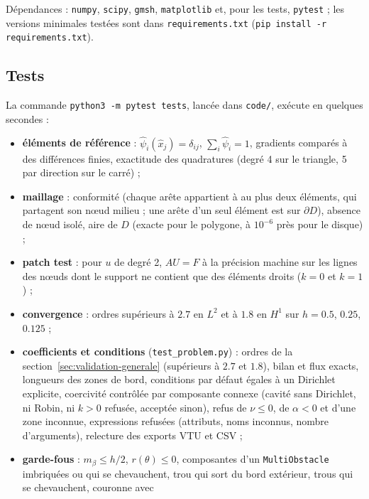\documentclass[11pt,a4paper]{article}
\begin{document}
Dépendances : \texttt{numpy}, \texttt{scipy}, \texttt{gmsh}, \texttt{matplotlib}
et, pour les tests, \texttt{pytest} ; les versions minimales testées sont
dans \texttt{requirements.txt} (\texttt{pip install -r requirements.txt}).

\subsection{Tests}
\label{sec:tests}

La commande \texttt{python3 -m pytest tests}, lancée dans \texttt{code/},
exécute en quelques secondes :
\begin{itemize}
  \item \textbf{éléments de référence} : $\widehat{\psi}_i(\hat{x}_j) = \delta_{ij}$,
        $\sum_i \widehat{\psi}_i = 1$, gradients comparés à des différences
        finies, exactitude des quadratures (degré 4 sur le triangle, 5 par
        direction sur le carré) ;
  \item \textbf{maillage} : conformité (chaque arête appartient à au plus
        deux éléments, qui partagent son nœud milieu ; une arête d'un seul
        élément est sur $\partial D$), absence de nœud isolé, aire de $D$
        (exacte pour le polygone, à $10^{-6}$ près pour le disque) ;
  \item \textbf{patch test} : pour $u$ de degré 2, $A U = F$ à la précision
        machine sur les lignes des nœuds dont le support ne contient que des
        éléments droits ($k = 0$ et $k = 1$) ;
  \item \textbf{convergence} : ordres supérieurs à $2.7$ en $L^2$ et à $1.8$
        en $H^1$ sur $h = 0.5$, $0.25$, $0.125$ ;
  \item \textbf{coefficients et conditions} (\texttt{test\_problem.py}) :
        ordres de la section~\ref{sec:validation-generale} (supérieurs à
        $2.7$ et $1.8$), bilan et flux exacts, longueurs des zones de bord,
        conditions par défaut égales à un Dirichlet explicite, coercivité
        contrôlée par composante connexe (cavité sans Dirichlet, ni Robin,
        ni $k > 0$ refusée, acceptée sinon), refus de $\nu \le 0$, de $\alpha < 0$ et d'une
        zone inconnue, expressions refusées (attributs, noms inconnus, nombre
        d'arguments), relecture des exports VTU et CSV ;
  \item \textbf{garde-fous} : $m_\beta \le h/2$, $r(\theta) \le 0$, composantes
        d'un \texttt{MultiObstacle} imbriquées ou qui se chevauchent, trou qui
        sort du bord extérieur, trous qui se chevauchent, couronne avec

\end{itemize}
\end{document}
